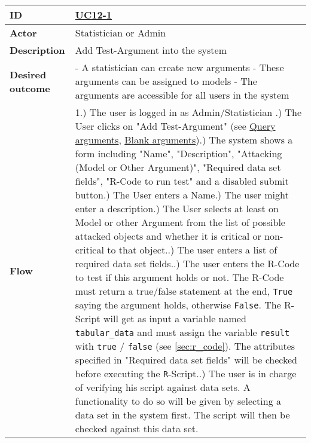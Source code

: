 \begin{table}[h]
\tiny{
	\begin{tabular}{|p{1.5cm} p{11.5cm}|}
		\hline
			\textbf{ID} & 
				\href{https://trello.com/c/2V6Cl65u}{UC12-1}\\
			
			\hline
			\textbf{Actor} & Statistician or Admin \\
			\hline
			\textbf{Description} & 
				Add Test-Argument into the system\\
			\hline
			\textbf{Desired outcome} & 
				- A statistician can create new arguments \newline
				- These arguments can be assigned to models \newline
				- The arguments are accessible for all users in the system \newline
		\\
		\hline
			\textbf{Flow} & 
				1.) The user is logged in as Admin/Statistician  \newline
				2.) The User clicks on "Add Test-Argument" (see \href{https://trello.com/c/OwM2Z7wt}{Query arguments}, \href{https://trello.com/c/Rg6GPnNE/39-uc12-5-add-attacks-between-arguments}{Blank arguments})\newline
				3.) The system shows a form including "Name", "Description", "Attacking (Model or Other Argument)", "Required data set fields", "R-Code to run test" and a disabled submit button\newline
				4.) The User enters a Name\newline
				5.) The user might enter a description\newline
				6.) The User selects at least on Model or other Argument from the list of possible attacked objects and whether it is critical or non-critical to that object.\newline
				7.) The user enters a list of required data set fields.\newline
				8.) The user enters the R-Code to test if this argument holds or not. The R-Code must return a true/false statement at the end, \texttt{True} saying the argument holds, otherwise \texttt{False}. The R-Script will get as input a variable named \texttt{tabular\_data}  and must assign the variable \texttt{result} with \texttt{true} / \texttt{false} (see \autoref{sec:r_code}). The attributes specified in "Required data set fields" will be checked before executing the \texttt{R}-Script.\newline
				9.) The user is in charge of verifying his script against data sets. A functionality to do so will be given by selecting a data set in the system first. The script will then be checked against this data set.\newline

\end{tabular}}
\end{table}
